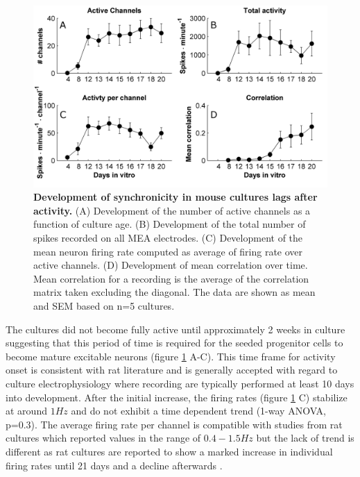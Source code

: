        \begin{figure}[!htb]
            \centering
            \includegraphics[width=15cm]{chapter3/figures/actMeasures/actMeasures.jpg}

            \caption[Averaged statistics of development of activity measures in mouse cultures]{\textbf{Development of synchronicity in mouse cultures lags after activity.} (A) Development of the number of active channels as a function of culture age. (B) Development of the total number of spikes recorded on all MEA electrodes. (C) Development of the mean neuron firing rate computed as average of firing rate over active channels. (D) Development of mean correlation over time. Mean correlation for a recording is the average of the correlation matrix taken excluding the diagonal. The data are shown as mean and SEM based on n=5 cultures.}
            \label{fig:activity:actMeasures}
        \end{figure}

        The cultures did not become fully active until approximately 2 weeks in culture suggesting that this period of time is required for the seeded progenitor cells to become mature excitable neurons (figure \ref{fig:activity:actMeasures} A-C). This time frame for activity onset is consistent with rat literature \cite{van2004long,wagenaar2006extremely,chiappalone2006dissociated} and is generally accepted with regard to culture electrophysiology where recording are typically performed at least 10 days into development.  After the initial increase, the firing rates (figure \ref{fig:activity:actMeasures} C) stabilize at around \(1 Hz\) and do not exhibit a time dependent trend (1-way ANOVA, p=0.3). The average firing rate per channel is compatible with studies from rat cultures which reported values in the range of \(0.4-1.5 Hz\) \cite{chiappalone2006dissociated,van2004long,corner2002physiological,penn2016network} but the lack of trend is different as rat cultures are reported to show a marked increase in individual firing rates until 21 days and a decline afterwards \cite{chiappalone2006dissociated,bikbaev2015brain}.

